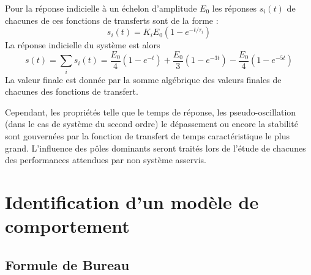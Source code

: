 Pour la réponse indicielle à un échelon d'amplitude $E_0$ les 
réponses $s_i(t)$ de chacunes de ces fonctions de transferts sont de la 
forme :
\[
s_i(t)=K_iE_0\left(1-e^{-t/\tau_i}\right)
\]
La réponse indicielle du système est alors
\[
s(t)=\sum_i s_i(t) = 
\dfrac{E_0}{4}\left(1-e^{-t}\right)+
\dfrac{E_0}{3}\left(1-e^{-3t}\right)-
\dfrac{E_0}{4}\left(1-e^{-5t}\right)
\]
La valeur finale est donnée par la somme algébrique des valeurs finales de 
chacunes des fonctions de transfert.

Cependant, les propriétés telle que le temps de réponse, 
les pseudo-oscillation (dans le cas de système du second ordre) 
le dépassement ou encore la stabilité sont gouvernées 
par la fonction de transfert de temps caractéristique le plus grand. 
L'influence des pôles dominants seront traités lors de l'étude 
de chacunes des performances attendues par non système asservis.
\section{Identification d'un modèle de comportement}
\subsection{Formule de Bureau}
\acplhp
